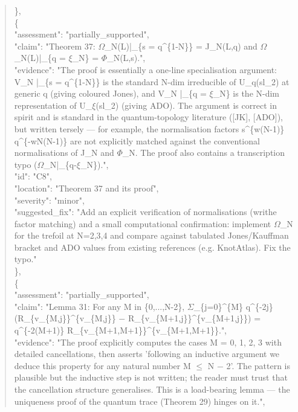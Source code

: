 \documentclass[11pt]{article}
\begin{document}
\begin{quote}
    \},\\
    \{\\
      "assessment": "partially\_supported",\\
      "claim": "Theorem 37: \ensuremath{\Omega}\_N(L)|\_\{s = q\^{}\{1-N\}\} = J\_N(L,q) and \ensuremath{\Omega}\_N(L)|\_\{q = \ensuremath{\xi}\_N\} = \ensuremath{\Phi}\_N(L,s).",\\
      "evidence": "The proof is essentially a one-line specialisation argument: V\_N |\_\{s = q\^{}\{1-N\}\} is the standard N-dim irreducible of U\_q(sl\_2) at generic q (giving coloured Jones), and V\_N |\_\{q = \ensuremath{\xi}\_N\} is the N-dim representation of U\_\ensuremath{\xi}(sl\_2) (giving ADO). The argument is correct in spirit and is standard in the quantum-topology literature ([JK], [ADO]), but written tersely --- for example, the normalisation factors s\^{}\{w(N-1)\} q\^{}\{-wN(N-1)\} are not explicitly matched against the conventional normalisations of J\_N and \ensuremath{\Phi}\_N. The proof also contains a transcription typo (\ensuremath{\Omega}\_N|\_\{q-\ensuremath{\xi}\_N\}).",\\
      "id": "C8",\\
      "location": "Theorem 37 and its proof",\\
      "severity": "minor",\\
      "suggested\_fix": "Add an explicit verification of normalisations (writhe factor matching) and a small computational confirmation: implement \ensuremath{\Omega}\_N for the trefoil at N=2,3,4 and compare against tabulated Jones/Kauffman bracket and ADO values from existing references (e.g. KnotAtlas). Fix the typo."\\
    \},\\
    \{\\
      "assessment": "partially\_supported",\\
      "claim": "Lemma 31: For any M in \{0,...,N-2\}, \ensuremath{\Sigma}\_\{j=0\}\^{}\{M\} q\^{}\{-2j\}(R\_\{v\_\{M,j\}\}\^{}\{v\_\{M,j\}\} \ensuremath{-} R\_\{v\_\{M+1,j\}\}\^{}\{v\_\{M+1,j\}\}) = q\^{}\{-2(M+1)\} R\_\{v\_\{M+1,M+1\}\}\^{}\{v\_\{M+1,M+1\}\}.",\\
      "evidence": "The proof explicitly computes the cases M = 0, 1, 2, 3 with detailed cancellations, then asserts 'following an inductive argument we deduce this property for any natural number M \ensuremath{\le} N \ensuremath{-} 2'. The pattern is plausible but the inductive step is not written; the reader must trust that the cancellation structure generalises. This is a load-bearing lemma --- the uniqueness proof of the quantum trace (Theorem 29) hinges on it.",\\

\end{quote}
\end{document}
